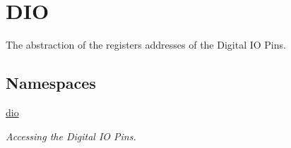 \hypertarget{group__DIOMCAL}{\section{D\+I\+O}
\label{group__DIOMCAL}
}


The abstraction of the registers addresses of the Digital I\+O Pins.  


\subsection*{Namespaces}
\begin{DoxyCompactItemize}
\item 
 \hyperlink{namespacedio}{dio}
\begin{DoxyCompactList}\small\item\em Accessing the Digital I\+O Pins. \end{DoxyCompactList}\end{DoxyCompactItemize}
